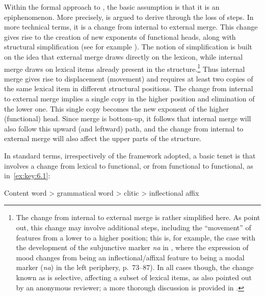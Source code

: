 \documentclass[output=paper]{langsci/langscibook}
\begin{document}
Within the formal approach to , the basic assumption is that
it is an epiphenomenon. More precisely,  is argued to derive
through the loss of  steps. In more technical terms, it is a change
from internal to external merge. This change gives rise to the creation of new
exponents of functional heads, along with structural simplification (see for
example \citealt{RobRou2003,vanGelderen2004}). The notion of simplification is
built on the idea that external merge draws directly on the lexicon, while
internal merge draws on lexical items already present in the
structure.\footnote{The change from internal to external merge is rather
    simplified here. As \citet{RobRou2003} point out, this change may involve
    additional steps, including the \enquote{movement} of features from a lower to a
    higher position; this is, for example, the case with the development of the
    subjunctive marker \emph{na} in , where the expression of mood changes
    from being an inflectional/affixal feature to being a modal marker
    (\emph{na}) in the left periphery, p.\ 73--87). In all cases though, the
    change known as  is selective, affecting a subset of
lexical items, as also pointed out by an anonymous reviewer; a more thorough
discussion is provided in \textcite[Ch.\ 5]{RobRou2003}.}  Thus internal merge
gives rise to displacement (movement) and requires at least two copies of the
same lexical item in different structural positions. The change from internal
to external merge implies a single copy in the higher position and elimination
of the lower one. This single copy becomes the new exponent of the higher
(functional) head. Since merge is bottom-up, it follows that internal merge
will also follow this upward (and leftward) path, and the change from internal
to external merge will also affect the upper parts of the structure.

In standard terms, irrespectively of the framework adopted, a basic tenet is
that  involves a change from lexical to functional, or from
functional to functional, as in~\eqref{ex:key:6.1}:

\ea\label{ex:key:6.1}
     Content word > grammatical word > clitic > inflectional affix
\z
\end{document}
